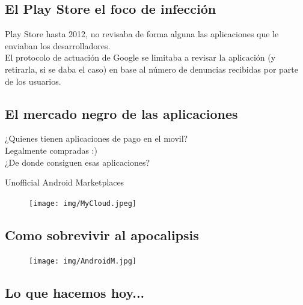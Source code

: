 \documentclass[12pt]{beamer} %
\begin{document}
\subsection{El Play Store el foco de infección}

\begin{slide}

 Play Store hasta 2012, no revisaba de forma alguna las aplicaciones que le enviaban los desarrolladores. \\
 El protocolo de actuación de Google se limitaba a revisar la aplicación (y retirarla, si se daba el caso)
 en base al número de denuncias recibidas por parte de los usuarios.
\end{slide}

\subsection{El mercado negro de las aplicaciones}

\begin{slide}

 ¿Quienes tienen aplicaciones de pago en el movil?\pause \\
 Legalmente compradas :) \pause \\
 ¿De donde consiguen esas aplicaciones?
  
\end{slide}


\begin{slide}
            Unofficial Android Marketplaces
    \begin{figure}[h]
      \texttt{[image: img/MyCloud.jpeg]}
    \end{figure}
\end{slide}

\subsection{Como sobrevivir al apocalipsis}

\begin{slide}
    \begin{figure}[h]
      \texttt{[image: img/AndroidM.jpg]}
    \end{figure}
\end{slide}


\subsection{Lo que hacemos hoy... }
\end{document}
